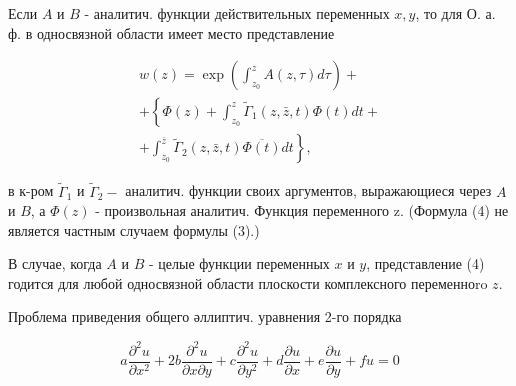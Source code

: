 \documentclass[10pt]{article}
\begin{document}
Если $A$ и $B$ - аналитич. функции действительных переменных $x, y$, то для О. а. ф. в односвязной области имеет место представление



\[

\begin{gathered}

w(z)=\exp \left(\int_{z_{0}}^{z} A(z, \tau) d \tau\right)+ \\

+\left\{\Phi(z)+\int_{z_{0}}^{z} \tilde{\Gamma}_{1}(z, \bar{z}, t) \Phi(t) d t+\right. \\

\left.+\int_{z_{0}}^{\bar{z}} \tilde{\Gamma}_{2}(z, \bar{z}, t) \overline{\Phi(t)} d t\right\},

\end{gathered}

\]



в к-ром $\tilde{\Gamma}_{1}$ и $\tilde{\Gamma}_{2}-$ аналитич. функции своих аргументов, выражающиеся через $A$ и $B$, а $\Phi(z)$ - произвольная аналитич. Функция переменного z. (Формула (4) не является частным случаем формулы (3).)



В случае, когда $A$ и $B$ - целые функции переменных $x$ и $y$, представление (4) годится для любой односвязной области плоскости комплексного переменноro $z$.



Проблема приведения общего әллиптич. уравнения 2-го порядка



\[

a \frac{\partial^{2} u}{\partial x^{2}}+2 b \frac{\partial^{2} u}{\partial x \partial y}+c \frac{\partial^{2} u}{\partial y^{2}}+d \frac{\partial u}{\partial x}+e \frac{\partial u}{\partial y}+f u=0

\]
\end{document}
